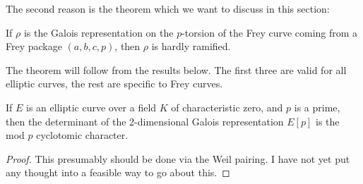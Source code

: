 The second reason is the theorem which we want to discuss in this section:

\begin{theorem}\label{frey_curve_hardly_ramified} If $\rho$ is the Galois representation on the $p$-torsion of the Frey curve coming from a Frey package $(a,b,c,p)$, then $\rho$ is hardly ramified.
\end{theorem}

The theorem will follow from the results below. The first three are valid for all elliptic curves, the rest are specific to Frey curves.


\begin{theorem}\label{Elliptic_curve_det_p_torsion} If $E$ is an elliptic curve over a field $K$ of characteristic zero, and $p$ is a prime, then the determinant of the 2-dimensional Galois representation $E[p]$ is the mod $p$ cyclotomic character.
\end{theorem}
\begin{proof}
  This presumably should be done via the Weil pairing. I have not yet put any thought into a feasible way to go about this.
\end{proof}


